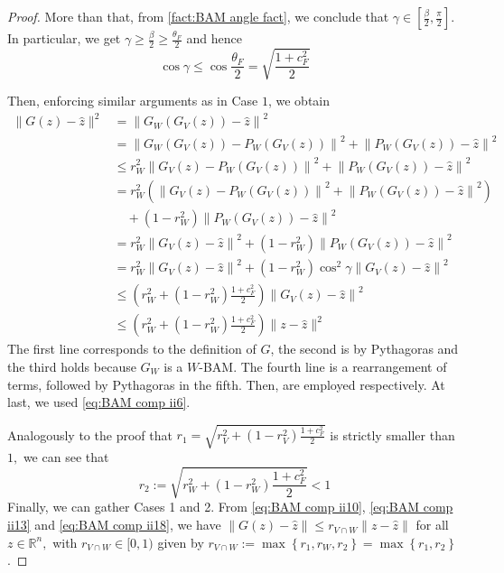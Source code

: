 \documentclass[smallextended,numbook,nospthms]{svjour3}
\theoremstyle{plain}
\theoremstyle{definition}
\def\RR{\mathds R}
\begin{document}
\begin{proof}
	More than that, from \cref{fact:BAM angle fact}, we conclude that $\gamma \in\left[\frac{\beta}{2}, \frac{\pi}{2}\right]$. In particular, we get $\gamma \geq \frac{\beta}{2} \geq \frac{\theta_{F}}{2}$ and hence
	\begin{equation}\label{eq:BAM comp ii17}
		\cos \gamma \leq \cos \frac{\theta_{F}}{2}=\sqrt{\frac{1+c_{F}^{2}}{2}}
	\end{equation}
	
	Then, enforcing similar arguments as in Case $1$, we obtain
	\begin{align}
		\|G(z)-\hat{z}\|^{2} &=\left\|G_{W}\left(G_{V}(z)\right)-\hat{z}\right\|^{2} \\
		&=\left\|G_{W}\left(G_{V}(z)\right)-P_{W}\left(G_{V}(z)\right)\right\|^{2}+\left\|P_{W}\left(G_{V}(z)\right)-\hat{z}\right\|^{2} \\
		& \leq r_{W}^{2}\left\|G_{V}(z)-P_{W}\left(G_{V}(z)\right)\right\|^{2}+\left\|P_{W}\left(G_{V}(z)\right)-\hat{z}\right\|^{2} \\
		&=r_{W}^{2}\left(\left\|G_{V}(z)-P_{W}\left(G_{V}(z)\right)\right\|^{2}+\left\|P_{W}\left(G_{V}(z)\right)-\hat{z}\right\|^{2}\right) \\
		& \quad +\left(1-r_{W}^{2}\right)\left\|P_{W}\left(G_{V}(z)\right)-\hat{z}\right\|^{2} \\
		&=r_{W}^{2}\left\|G_{V}(z)-\hat{z}\right\|^{2}+\left(1-r_{W}^{2}\right)\left\|P_{W}\left(G_{V}(z)\right)-\hat{z}\right\|^{2} \\
		&=r_{W}^{2}\left\|G_{V}(z)-\hat{z}\right\|^{2}+\left(1-r_{W}^{2}\right) \cos ^{2} \gamma\left\|G_{V}(z)-\hat{z}\right\|^{2} \\
		& \leq\left(r_{W}^{2}+\left(1-r_{W}^{2}\right) \frac{1+c_{F}^{2}}{2}\right)\left\|G_{V}(z)-\hat{z}\right\|^{2} \\
		& \leq\left(r_{W}^{2}+\left(1-r_{W}^{2}\right) \frac{1+c_{F}^{2}}{2}\right)\|z-\hat{z}\|^{2} \label{eq:BAM comp ii18}
	\end{align}
	The first line corresponds to the definition of $G$, the second is by Pythagoras and the third holds because $G_{W}$ is a $W$-BAM. The fourth line is a rearrangement of terms, followed by Pythagoras in the fifth. Then, \label{eq:BAM comp ii16,eq:BAM comp ii17} are employed respectively. At last, we used \cref{eq:BAM comp ii6}.
	
	Analogously to the proof that $r_{1}=\sqrt{r_{V}^{2}+\left(1-r_{V}^{2}\right) \frac{1+c_{F}^{2}}{2}}$ is strictly smaller than $1,$ we can see that
	\begin{equation}
		r_{2}:=\sqrt{r_{W}^{2}+\left(1-r_{W}^{2}\right) \frac{1+c_{F}^{2}}{2}}<1
	\end{equation}
	Finally, we can gather Cases 1 and 2. From \cref{eq:BAM comp ii10}, \cref{eq:BAM comp ii13} and \cref{eq:BAM comp ii18}, we have $\|G(z)-\hat{z}\| \leq r_{V \cap W}\|z-\hat{z}\|$ for all $z \in \RR^{n},$ with $r_{V \cap W} \in[0,1)$ given by $r_{V \cap W}:=\max \left\{r_{1}, r_{W}, r_{2}\right\}=\max \left\{r_{1}, r_{2}\right\}$.
\end{proof}
\end{document}
